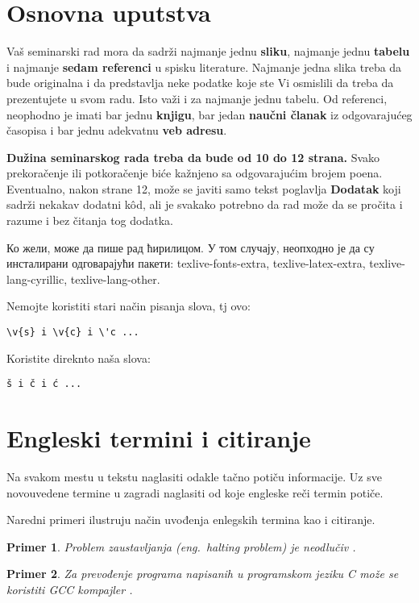 \documentclass[a4paper]{article}
\newtheorem{primer}{Primer}[section]
\begin{document}
\section{Osnovna uputstva}
Vaš seminarski rad mora da sadrži najmanje jednu \textbf{sliku}, najmanje jednu \textbf{tabelu} i najmanje \textbf{sedam referenci} u spisku literature. Najmanje jedna slika treba da bude originalna i da predstavlja neke podatke koje ste Vi osmislili da treba da prezentujete u svom radu. Isto važi i za najmanje jednu tabelu. 	Od referenci, neophodno je imati bar jednu \textbf{knjigu}, bar jedan \textbf{naučni članak} iz odgovarajućeg časopisa i bar jednu adekvatnu \textbf{veb adresu}. 

\textbf{Dužina seminarskog rada treba da bude od 10 do 12 strana.} Svako prekoračenje ili potkoračenje biće kažnjeno sa odgovarajućim brojem poena. Eventualno, nakon strane 12, može se javiti samo tekst poglavlja \textbf{Dodatak} koji sadrži nekakav dodatni k\^{o}d, ali je svakako potrebno da rad može da se pročita i razume i bez čitanja tog dodatka. 

Ко жели, може да пише рад ћирилицом. У том случају, неопходно је да су инсталирани одговарајући пакети: texlive-fonts-extra, texlive-latex-extra, texlive-lang-cyrillic, texlive-lang-other. 

Nemojte koristiti stari način pisanja slova, tj ovo:
\begin{verbatim}
\v{s} i \v{c} i \'c ...
\end{verbatim}
Koristite direknto naša slova:	
\begin{verbatim}
š i č i ć ... 
\end{verbatim}


\section{Engleski termini i citiranje}	
\label{sec:termini_i_citiranje}

Na svakom mestu u tekstu naglasiti odakle tačno potiču informacije. Uz sve novouvedene termine u zagradi naglasiti od koje engleske reči termin potiče. 

Naredni primeri ilustruju način uvođenja enlegskih termina kao i citiranje.

\begin{primer}
Problem zaustavljanja (eng.~{\em halting problem}) je neodlučiv \cite{haltingproblem}.
\end{primer}

\begin{primer}
Za prevođenje programa napisanih u programskom jeziku C može se koristiti GCC kompajler \cite{gcc}.
\end{primer}
\end{document}
